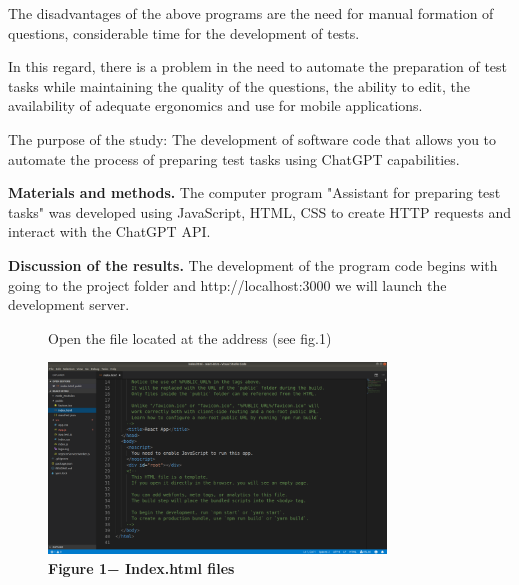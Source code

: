 \begin{multicols}{2}

The disadvantages of the above programs are the need for manual
formation of questions, considerable time for the development of tests.

In this regard, there is a problem in the need to automate the
preparation of test tasks while maintaining the quality of the
questions, the ability to edit, the availability of adequate ergonomics
and use for mobile applications.


The purpose of the study: The development of software code that allows
you to automate the process of preparing test tasks using ChatGPT
capabilities.

{\bfseries Materials and methods.} The computer program "Assistant for
preparing test tasks" was developed using JavaScript, HTML, CSS to
create HTTP requests and interact with the ChatGPT API.

{\bfseries Discussion of the results.} The development of the program code
begins with going to the project folder and http://localhost:3000 we
will launch the development server.


\end{multicols}

\begin{figure}[H]
	\caption*{Open the file located at the address (see fig.1)} 
	\centering
	\includegraphics[width=0.8\textwidth]{assets/126}
	\caption*{\bfseries Figure 1− Index.html files}
\end{figure}


